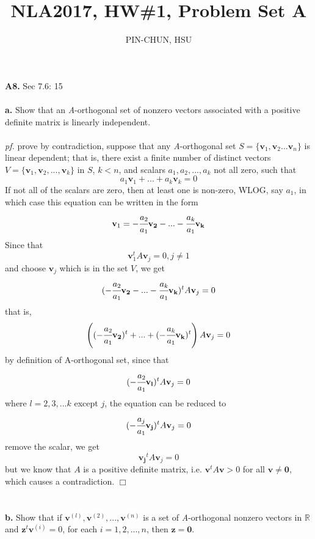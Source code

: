 \documentclass[12pt, a4paper]{article}
\title{NLA2017, HW\#1, Problem Set A}
\author{PIN-CHUN, HSU}
\begin{document}
\maketitle{}

{\large \textbf{A8.} Sec 7.6: 15} \\
\\
\textbf{a.} Show that an \textit{A}-orthogonal set of nonzero vectors associated with a positive definite matrix is linearly independent.
\\
\\
\textit{pf.} prove by contradiction, suppose that any \textit{A}-orthogonal set $S = \{\mathbf{v}_1, \mathbf{v}_2...\mathbf{v}_n\}$ is linear dependent; that is, there exist a finite number of distinct vectors $V = \{\mathbf{v}_1, \mathbf{v}_2, ..., \mathbf{v}_k\}$ in $S$, $k < n$, and scalars $a_1, a_2, ..., a_k$ not all zero, such that $$ a_1 \mathbf{v}_1 + ... + a_k \mathbf{v}_k = 0$$ 
If not all of the scalars are zero, then at least one is non-zero, WLOG, say $a_{1}$, in which case this equation can be written in the form $$\mathbf{v}_1 = -\cfrac{a_2}{a_1}\mathbf{v_2}-...-\cfrac{a_k}{a_1}\mathbf{v_k}$$
Since that $$\mathbf{v}_1^{t}A\mathbf{v}_j = 0, j \neq 1$$and choose $\mathbf{v}_j$ which is in the set $V$, we get $$(-\cfrac{a_2}{a_1}\mathbf{v_2}-...-\cfrac{a_k}{a_1}\mathbf{v_k})^{t}A\mathbf{v}_j = 0$$ that is, $$\left((-\cfrac{a_2}{a_1}\mathbf{v_2})^{t}+...+(-\cfrac{a_k}{a_1}\mathbf{v_k})^{t}\right)A\mathbf{v}_j = 0$$ 
by definition of A-orthogonal set, since that $$(-\cfrac{a_2}{a_1}\mathbf{v_l})^{t}A\mathbf{v}_j = 0$$ where $l = 2, 3, ...k$ except $j$, the equation can be reduced to $$(-\cfrac{a_j}{a_1}\mathbf{v_j})^{t}A\mathbf{v}_j = 0$$ remove the scalar, we get $$\mathbf{v_j}^{t}A\mathbf{v}_j = 0$$ but we know that $A$ is a positive definite matrix, i.e. $\mathbf{v}^{t}A\mathbf{v} > 0$ for all $\mathbf{v} \neq \mathbf{0}$, which causes a contradiction. $\Box$
\\
\\
\\
\textbf{b.} Show that if ${\mathbf{v}^{(l)}, \mathbf{v}^{(2)},... , \mathbf{v}^{(n)}}$ is a set of \textit{A}-orthogonal nonzero vectors in $\mathbb{R}$ and $\mathbf{z}^{t}\mathbf{v}^{(i)} = 0$, for each $i = 1,2,... ,n$, then $\mathbf{z} = \mathbf{0}$.
\end{document}

